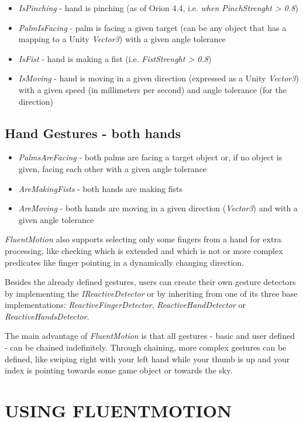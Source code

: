 \documentclass{sigchi}
\def\fluentmotion{\textit{FluentMotion}}
\begin{document}
\begin{itemize}
  \item \textit{IsPinching} - hand is pinching (as of Orion 4.4, i.e. \textit{when PinchStrenght > 0.8})
  \item \textit{PalmIsFacing} - palm is facing a given target (can be any object that has a mapping to a Unity \textit{Vector3}) with a given angle tolerance
  \item  \textit{IsFist} - hand is making a fist (i.e. \textit{FistStrenght > 0.8})
  \item \textit{IsMoving} - hand is moving in a given direction (expressed as a Unity \textit{Vector3}) with a given speed (in millimeters per second) and angle tolerance (for the direction) 
\end{itemize}

\subsection{Hand Gestures - both hands}
\begin{itemize}
  \item \textit{PalmsAreFacing} - both palms are facing a target object or, if no object is given, facing each other with a given angle tolerance
  \item \textit{AreMakingFists} - both hands are making fists
  \item \textit{AreMoving} - both hands are moving in a given direction (\textit{Vector3}) and with a given angle tolerance
\end{itemize}

\fluentmotion{} also supports selecting only some fingers from a hand for extra processing, like checking which is extended and which is not or more complex predicates like finger pointing in a dynamically changing direction.


Besides the already defined gestures, users can create their own gesture detectors by implementing the \textit{IReactiveDetector} or by inheriting from one of its three base implementations: \textit{ReactiveFingerDetector}, \textit{ReactiveHandDetector} or \textit{ReactiveHandsDetector}.


The main advantage of \fluentmotion{} is that all gestures - basic and user defined - can be chained indefinitely. Through chaining, more complex gestures can be defined, like swiping right with your left hand while your thumb is up and your index is pointing towards some game object or towards the sky.

\section{USING FLUENTMOTION}
\end{document}
